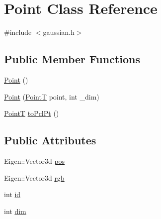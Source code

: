 \hypertarget{class_point}{\section{\-Point \-Class \-Reference}
\label{class_point}
}


{\ttfamily \#include $<$gaussian.\-h$>$}

\subsection*{\-Public \-Member \-Functions}
\begin{DoxyCompactItemize}
\item 
\hyperlink{class_point_ad92f2337b839a94ce97dcdb439b4325a}{\-Point} ()
\item 
\hyperlink{class_point_a5fa998f123a3d672481e4b5ac278d916}{\-Point} (\hyperlink{common_8h_af63aa02ad22799ec1b392e97942874b5}{\-Point\-T} point, int \-\_\-dim)
\item 
\hyperlink{common_8h_af63aa02ad22799ec1b392e97942874b5}{\-Point\-T} \hyperlink{class_point_a35bab37614a66e097af4fdb7dbc2d76f}{to\-Pcl\-Pt} ()
\end{DoxyCompactItemize}
\subsection*{\-Public \-Attributes}
\begin{DoxyCompactItemize}
\item 
\-Eigen\-::\-Vector3d \hyperlink{class_point_ae84efd1582c7c76ba5b8afbe5b4f6149}{pos}
\item 
\-Eigen\-::\-Vector3d \hyperlink{class_point_aa6a6084434d35335bc8074e34013ebe1}{rgb}
\item 
int \hyperlink{class_point_a3ccd2080027d6845744bd044280da9e7}{id}
\item 
int \hyperlink{class_point_ad506f1484a4c9a0ba5e1d40019584de9}{dim}
\end{DoxyCompactItemize}



